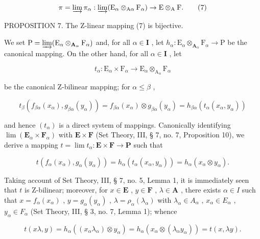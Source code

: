 \[
\pi = \varinjlim \pi_ {\alpha}: \varinjlim (\mathrm{E} _ {\alpha} \otimes_ {\mathrm{A} \alpha} \mathrm{F} _ {\alpha}) \rightarrow \mathrm{E} \otimes_ {\mathrm{A}} \mathrm{F}.\tag{7}
\]

PROPOSITION 7. The Z-linear mapping (7) is bijective.

We set \(\mathrm{P} = \varinjlim (\mathrm{E}_{\alpha}\otimes_{\mathbf{A}_{\alpha}}\mathrm{F}_{\alpha})\) and, for all \(\alpha \in \mathbf{I}\) , let \(h_\alpha : \mathrm{E}_\alpha \otimes_{\mathbf{A}_\alpha}\mathrm{F}_\alpha \to \mathrm{P}\) be the canonical mapping. On the other hand, for all \(\alpha \in \mathbf{I}\) , let

\[
t _ {\alpha}: \mathrm{E} _ {\alpha} \times \mathrm{F} _ {\alpha} \rightarrow \mathrm{E} _ {\alpha} \otimes_ {\mathrm{A} _ {\alpha}} \mathrm{F} _ {\alpha}
\]

be the canonical Z-bilinear mapping; for \(\alpha \leqslant \beta\) ,

\[
t _ {\beta} \left(f _ {\beta \alpha} \left(x _ {\alpha}\right), g _ {\beta \alpha} \left(y _ {\alpha}\right)\right) = f _ {\beta \alpha} \left(x _ {\alpha}\right) \otimes g _ {\beta \alpha} \left(y _ {\alpha}\right) = h _ {\beta \alpha} \left(t _ {\alpha} \left(x _ {\alpha}, y _ {\alpha}\right)\right)
\]

and hence \((t_{\alpha})\) is a direct system of mappings. Canonically identifying \(\lim (\mathbf{E}_{\alpha}\times \mathbf{F}_{\alpha})\) with \(\mathbf{E}\times \mathbf{F}\) (Set Theory, III, § 7, no. 7, Proposition 10), we derive a mapping \(t = \lim t_{\alpha}:\mathbf{E}\times \mathbf{F}\to \mathbf{P}\) such that

\[
t \left(f _ {\alpha} (x _ {\alpha}), g _ {\alpha} (y _ {\alpha})\right) = h _ {\alpha} \left(t _ {\alpha} \left(x _ {\alpha}, y _ {\alpha}\right)\right) = h _ {\alpha} \left(x _ {\alpha} \otimes y _ {\alpha}\right).
\]

Taking account of Set Theory, III, § 7, no. 5, Lemma 1, it is immediately seen that \(t\) is Z-bilinear; moreover, for \(x \in \mathbf{E}\) , \(y \in \mathbf{F}\) , \(\lambda \in \mathbf{A}\) , there exists \(\alpha \in I\) such that \(x = f_{\alpha}(x_{\alpha})\) , \(y = g_{\alpha}(y_{\alpha})\) , \(\lambda = \rho_{\alpha}(\lambda_{\alpha})\) with \(\lambda_{\alpha} \in A_{\alpha}\) , \(x_{\alpha} \in E_{\alpha}\) , \(y_{\alpha} \in F_{\alpha}\) (Set Theory, III, § 3, no. 7, Lemma 1); whence

\[
t (x \lambda , y) = h _ {\alpha} ((x _ {\alpha} \lambda_ {\alpha}) \otimes y _ {\alpha}) = h _ {\alpha} (x _ {\alpha} \otimes (\lambda_ {\alpha} y _ {\alpha})) = t (x, \lambda y).
\]

